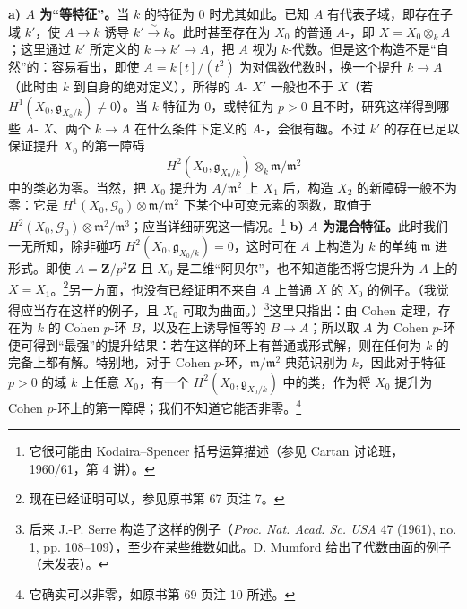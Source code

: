 \textbf{a) $A$ 为“等特征”。}当 $k$ 的特征为 $0$ 时尤其如此。已知 $A$ 有代表子域，即存在子域 $k'$，使 $A\to k$ 诱导 $k'\xrightarrow{\sim}k$。此时甚至存在为 $X_0$ 的普通 $A$-，即 $X=X_0\otimes_k A$；这里通过 $k'$ 所定义的 $k\to k'\to A$，把 $A$ 视为 $k$-代数。但是这个构造不是“自然”的：容易看出，即使 $A=k[t]/(t^2)$ 为对偶数代数时，换一个提升 $k\to A$（此时由 $k$ 到自身的绝对定义），所得的 $A$- $X'$ 一般也不于 $X$（若 $H^1(X_0,\mathfrak g_{X_0/k})\ne0$）。当 $k$ 特征为 $0$，或特征为 $p>0$ 且不时，研究这样得到哪些 $A$- $X$、两个 $k\to A$ 在什么条件下定义的 $A$-，会很有趣。不过 $k'$ 的存在已足以保证提升 $X_0$ 的第一障碍
\[H^2(X_0,\mathfrak g_{X_0/k})\otimes_k\mathfrak m/\mathfrak m^2\]
中的类必为零。当然，把 $X_0$ 提升为 $A/\mathfrak m^2$ 上 $X_1$ 后，构造 $X_2$ 的新障碍一般不为零：它是 $H^1(X_0,\mathcal G_0)\otimes\mathfrak m/\mathfrak m^2$ 下某个中可变元素的函数，取值于 $H^2(X_0,\mathcal G_0)\otimes\mathfrak m^2/\mathfrak m^3$；应当详细研究这一情况。\footnote{它很可能由 Kodaira--Spencer 括号运算描述（参见 Cartan 讨论班，1960/61，第 4 讲）。}
\textbf{b) $A$ 为混合特征。}此时我们一无所知，除非碰巧 $H^2(X_0,\mathfrak g_{X_0/k})=0$，这时可在 $A$ 上构造为 $k$ 的单纯 $\mathfrak m$ 进形式。即使 $A=\mathbf Z/p^2\mathbf Z$ 且 $X_0$ 是二维“阿贝尔”，也不知道能否将它提升为 $A$ 上的 $X=X_1$。\footnote{现在已经证明可以，参见原书第 67 页注 7。}另一方面，也没有已经证明不来自 $A$ 上普通 $X$ 的 $X_0$ 的例子。（我觉得应当存在这样的例子，且 $X_0$ 可取为曲面。）\footnote{后来 J.-P. Serre 构造了这样的例子（\emph{Proc. Nat. Acad. Sc. USA} 47 (1961), no. 1, pp. 108--109），至少在某些维数如此。D. Mumford 给出了代数曲面的例子（未发表）。}这里只指出：由 Cohen 定理，存在为 $k$ 的 Cohen $p$-环 $B$，以及在上诱导恒等的 $B\to A$；所以取 $A$ 为 Cohen $p$-环便可得到“最强”的提升结果：若在这样的环上有普通或形式解，则在任何为 $k$ 的完备上都有解。特别地，对于 Cohen $p$-环，$\mathfrak m/\mathfrak m^2$ 典范识别为 $k$，因此对于特征 $p>0$ 的域 $k$ 上任意 $X_0$，有一个 $H^2(X_0,\mathfrak g_{X_0/k})$ 中的类，作为将 $X_0$ 提升为 Cohen $p$-环上的第一障碍；我们不知道它能否非零。\footnote{它确实可以非零，如原书第 69 页注 10 所述。}
